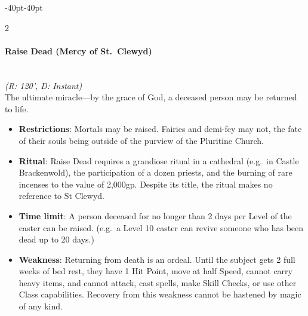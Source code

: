 \documentclass{book}
\providecommand{\tightlist}{%
\setlength{\itemsep}{0pt}\setlength{\parskip}{0pt}}
\begin{document}
\begin{adjustwidth}{-40pt}{-40pt}
\begin{multicols}{2}
\paragraph{Raise Dead (Mercy of
	St.~Clewyd)}\label{raise-dead-mercy-of-st.-clewyd}\mbox{}\\
\emph{(R: 120', D: Instant)}\\
The ultimate miracle---by the grace of God, a deceased person may be
returned to life.

\begin{itemize}
	\tightlist
	\item
	\textbf{Restrictions}: Mortals may be raised. Fairies and demi-fey may
	not, the fate of their souls being outside of the purview of the
	Pluritine Church.
	\item
	\textbf{Ritual}: Raise Dead requires a grandiose ritual in a cathedral
	(e.g.~in Castle Brackenwold), the participation of a dozen priests,
	and the burning of rare incenses to the value of 2,000gp. Despite its
	title, the ritual makes no reference to St Clewyd.
	\item
	\textbf{Time limit}: A person deceased for no longer than 2 days per
	Level of the caster can be raised. (e.g.~a Level 10 caster can revive
	someone who has been dead up to 20 days.)
	\item
	\textbf{Weakness}: Returning from death is an ordeal. Until the
	subject gets 2 full weeks of bed rest, they have 1 Hit Point, move at
	half Speed, cannot carry heavy items, and cannot attack, cast spells,
	make Skill Checks, or use other Class capabilities. Recovery from this
	weakness cannot be hastened by magic of any kind.
\end{itemize}

\end{multicols}

\end{adjustwidth}
\end{document}
